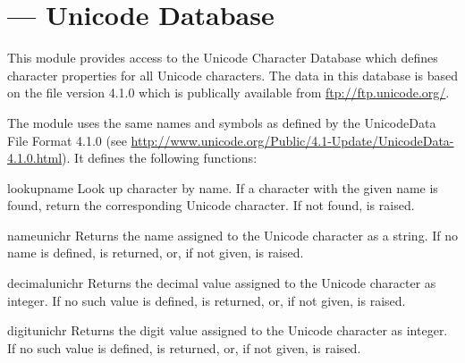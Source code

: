 \section{ ---
         Unicode Database}



This module provides access to the Unicode Character Database which
defines character properties for all Unicode characters. The data in
this database is based on the  file version
4.1.0 which is publically available from \url{ftp://ftp.unicode.org/}.

The module uses the same names and symbols as defined by the
UnicodeData File Format 4.1.0 (see
\url{http://www.unicode.org/Public/4.1-Update/UnicodeData-4.1.0.html}).  It
defines the following functions:

\begin{funcdesc}{lookup}{name}
  Look up character by name.  If a character with the
  given name is found, return the corresponding Unicode
  character.  If not found,  is raised.
\end{funcdesc}

\begin{funcdesc}{name}{unichr}
  Returns the name assigned to the Unicode character
   as a string. If no name is defined,
   is returned, or, if not given,
   is raised.
\end{funcdesc}

\begin{funcdesc}{decimal}{unichr}
  Returns the decimal value assigned to the Unicode character
   as integer. If no such value is defined,
   is returned, or, if not given,
   is raised.
\end{funcdesc}

\begin{funcdesc}{digit}{unichr}
  Returns the digit value assigned to the Unicode character
   as integer. If no such value is defined,
   is returned, or, if not given,
   is raised.
\end{funcdesc}

